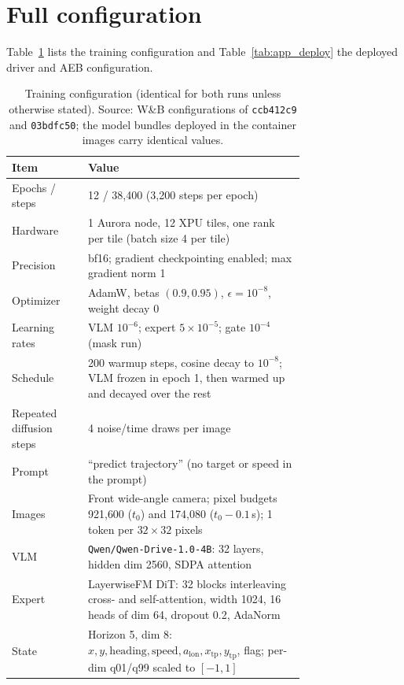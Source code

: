 \captionsetup{font=footnotesize,skip=4pt}
\setlength{\intextsep}{6pt}
\setlength{\columnsep}{12pt}

\FloatBarrier
\section{Full configuration}
\label{app:config}
Table~\ref{tab:app_cfg} lists the training configuration and Table~\ref{tab:app_deploy} the deployed driver and AEB configuration.

\begin{table}[!htb]
\centering\scriptsize
\caption{Training configuration (identical for both runs unless otherwise stated). Source: W\&B configurations of \texttt{ccb412c9} and \texttt{03bdfc50}; the model bundles deployed in the container images carry identical values.}
\label{tab:app_cfg}
\begin{tabular}{@{}lp{0.74\linewidth}@{}}
\toprule
Item & Value \\
\midrule
Epochs / steps & 12 / 38{,}400 (3{,}200 steps per epoch) \\
Hardware & 1 Aurora node, 12 XPU tiles, one rank per tile (batch size 4 per tile) \\
Precision & bf16; gradient checkpointing enabled; max gradient norm 1 \\
Optimizer & AdamW, betas $(0.9, 0.95)$, $\epsilon=10^{-8}$, weight decay 0 \\
Learning rates & VLM $10^{-6}$; expert $5\times10^{-5}$; gate $10^{-4}$ (mask run) \\
Schedule & 200 warmup steps, cosine decay to $10^{-8}$; VLM frozen in epoch 1, then warmed up and decayed over the rest \\
Repeated diffusion steps & 4 noise/time draws per image \\
Prompt & ``predict trajectory'' (no target or speed in the prompt) \\
Images & Front wide-angle camera; pixel budgets 921{,}600 ($t_0$) and 174{,}080 ($t_0-0.1$\,s); 1 token per $32\times32$ pixels \\
VLM & \texttt{Qwen/Qwen-Drive-1.0-4B}: 32 layers, hidden dim 2560, SDPA attention \\
Expert & LayerwiseFM DiT: 32 blocks interleaving cross- and self-attention, width 1024, 16 heads of dim 64, dropout 0.2, AdaNorm \\
State & Horizon 5, dim 8: $x, y, \mathrm{heading}, \mathrm{speed}, a_\mathrm{lon}, x_\mathrm{tp}, y_\mathrm{tp}$, flag; per-dim q01/q99 scaled to $[-1,1]$ \\

\end{tabular}
\end{table}
